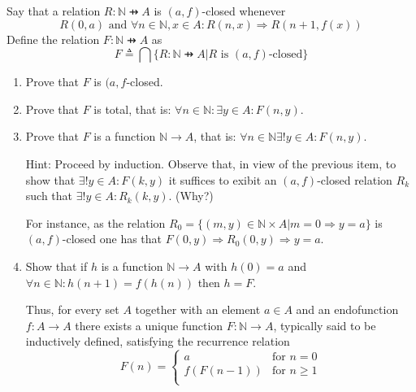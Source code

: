 \documentclass[10pt,\jkfside,a4paper]{article}
\begin{document}
Say that a relation $R: \mathbb{N} \pfun A$ is $(a, f)$-closed whenever
\begin{equation}
R(0, a) \text{ and } \forall n \in \mathbb{N}, x \in A: R(n, x) \Rightarrow R(n + 1, f(x))
\end{equation}
Define the relation $F: \mathbb{N} \pfun A$ as
\begin{equation}
F \triangleq \bigcap\{R: \mathbb{N} \pfun A | R \text{ is } (a, f)\text{-closed}\}
\end{equation}

\begin{enumerate}

\item Prove that $F$ is $(a, f$-closed.



\item Prove that $F$ is total, that is: $\forall n \in \mathbb{N}: \exists y \in A: F(n, y)$.



\item Prove that $F$ is a function $\mathbb{N} \rightarrow A$, that is: $\forall n \in \mathbb{N} \exists ! y \in A: F(n, y)$.

Hint: Proceed by induction. Observe that, in view of the previous item, to show that $\exists !y \in A: F(k, y)$ it suffices to 
exibit an $(a, f)$-closed relation $R_k$ such that $\exists ! y \in A: R_k(k, y)$. (Why?)

For instance, as the relation $R_0 = \{(m, y) \in \mathbb{N} \times A | m = 0 \Rightarrow y = a\}$ is $(a, f)$-closed one 
has that $F(0, y) \Rightarrow R_0(0, y) \Rightarrow y = a$.



\item Show that if $h$ is a function $\mathbb{N} \rightarrow A$ with $h(0) = a$ and $\forall n \in \mathbb{N}: h(n + 1) = f(h(n))$ then 
$h = F$.

Thus, for every set $A$ together with an element $a \in A$ and an endofunction $f: A \rightarrow A$ there exists a unique function 
$F: \mathbb{N} \rightarrow A$, typically said to be inductively defined, satisfying the recurrence relation
\begin{equation}
F(n) = 
\begin{cases}
a & \text{for } n = 0\\
f(F(n - 1)) & \text{for } n \geq 1\\
\end{cases}
\end{equation}

\end{enumerate}
\end{document}
